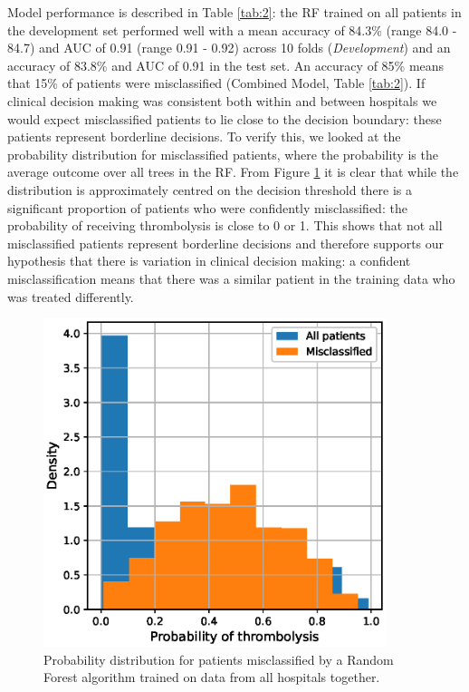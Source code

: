\documentclass[12pt,a4paper, pdftex]{elsarticle}
\newcommand{\manote}[2][\textcolor{magenta}{\dagger}]{\textcolor{magenta}{$#1$}\marginpar{\color{magenta}\raggedright\tiny$#1$ #2}}
\begin{document}
Model performance is described in Table \ref{tab:2}: the RF trained on all patients in the development set performed well with a mean accuracy of 84.3\% (range 84.0 - 84.7) and AUC of 0.91 (range 0.91 - 0.92) across 10 folds ({\it Development}) and an accuracy of 83.8\% and AUC of 0.91 in the test set. An accuracy of 85\% means that 15\% of patients were misclassified (Combined Model, Table \ref{tab:2}). If clinical decision making was consistent both within and between hospitals we would expect misclassified patients to lie close to the decision boundary: these patients represent borderline decisions. To verify this, we looked at the probability distribution for misclassified patients, where the probability is the average outcome over all trees in the RF. From Figure \ref{fig:hist} it is clear that while the distribution is approximately centred on the decision threshold there is a significant proportion of patients who were confidently misclassified: the probability of receiving thrombolysis is close to 0 or 1. This shows that not all misclassified patients represent borderline decisions and therefore supports our hypothesis that there is variation in clinical decision making: a confident misclassification means that there was a similar patient in the training data who was treated differently. %

\begin{figure}[h!!!]
\centering
\includegraphics[width=10cm]{figures/probability_histogram.eps}
\caption{Probability distribution for patients misclassified by a Random Forest algorithm trained on data from all hospitals together.}
\label{fig:hist}
\end{figure}
\end{document}
